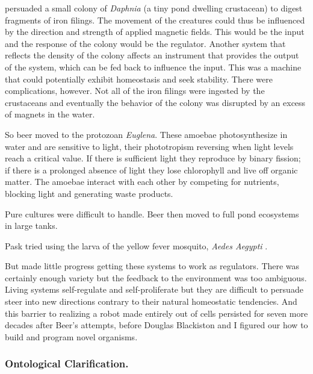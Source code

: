 \citet{beer1962progress}
persuaded a small colony of \textit{Daphnia} (a tiny pond dwelling crustacean) to digest fragments of iron filings.
The movement of the creatures could thus be influenced by 
the direction and strength of applied magnetic fields.
This would be the input and the response of the colony would be the regulator.
Another system that reflects the density of the colony affects an instrument that provides the output of the system, which can be fed back to influence the input.
This was a machine that could potentially exhibit homeostasis and seek stability.
There were complications, however.
Not all of the iron filings were ingested by the crustaceans and eventually the behavior of the colony was disrupted by an excess of magnets in the water.

So beer moved to the protozoan \textit{Euglena}.
These amoebae photosynthesize in water and are sensitive to light, their
phototropism reversing when light levels reach a critical value. 
If there is sufficient light they reproduce by binary fission; if there is a prolonged absence of light they lose chlorophyll and live off organic matter. 
The amoebae interact with each other by competing for nutrients, blocking light and generating waste products.

Pure cultures were difficult to handle.
Beer then moved to full pond ecosystems in large tanks.

Pask tried using the larva of the yellow fever mosquito, \textit{Aedes Aegypti} \cite{beer1962progress}.

But made little progress getting these systems to work as regulators.
There was certainly enough variety but the feedback to the environment was too ambiguous.
Living systems self-regulate and self-proliferate but they are difficult to persuade steer into new directions contrary to their natural homeostatic tendencies.
And this barrier to realizing a robot made entirely out of cells persisted for seven more decades after Beer's attempts, before Douglas Blackiston and I figured our how to build and program novel organisms.


\subsubsection*{Ontological Clarification.}


